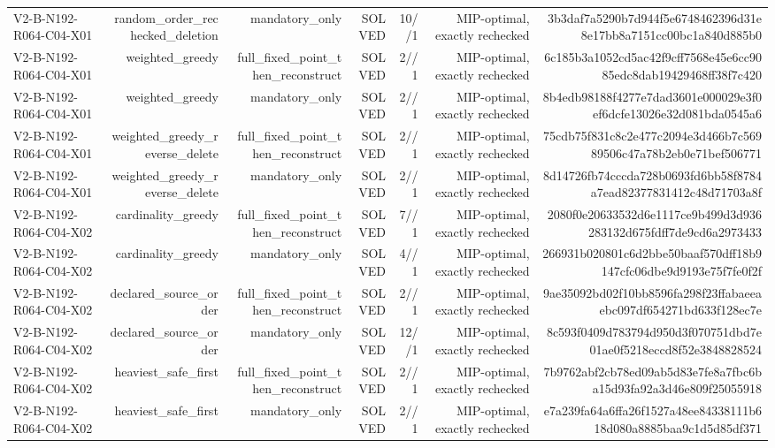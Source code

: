 {\begin{longtable}{lrrrrrr}
V2-B-N192-R064-C04-X01 & random\_order\_rechecked\_deletion & mandatory\_only & SOLVED & 10//1 & MIP-optimal, exactly rechecked & 3b3daf7a5290b7d944f5e6748462396d31e8e17bb8a7151cc00bc1a840d885b0 \\
V2-B-N192-R064-C04-X01 & weighted\_greedy & full\_fixed\_point\_then\_reconstruct & SOLVED & 2//1 & MIP-optimal, exactly rechecked & 6c185b3a1052cd5ac42f9cff7568e45e6cc9085edc8dab19429468ff38f7c420 \\
V2-B-N192-R064-C04-X01 & weighted\_greedy & mandatory\_only & SOLVED & 2//1 & MIP-optimal, exactly rechecked & 8b4edb98188f4277e7dad3601e000029e3f0ef6dcfe13026e32d081bda0545a6 \\
V2-B-N192-R064-C04-X01 & weighted\_greedy\_reverse\_delete & full\_fixed\_point\_then\_reconstruct & SOLVED & 2//1 & MIP-optimal, exactly rechecked & 75cdb75f831c8c2e477c2094e3d466b7c56989506c47a78b2eb0e71bef506771 \\
V2-B-N192-R064-C04-X01 & weighted\_greedy\_reverse\_delete & mandatory\_only & SOLVED & 2//1 & MIP-optimal, exactly rechecked & 8d14726fb74cccda728b0693fd6bb58f8784a7ead82377831412c48d71703a8f \\
V2-B-N192-R064-C04-X02 & cardinality\_greedy & full\_fixed\_point\_then\_reconstruct & SOLVED & 7//1 & MIP-optimal, exactly rechecked & 2080f0e20633532d6e1117ce9b499d3d936283132d675fdff7de9cd6a2973433 \\
V2-B-N192-R064-C04-X02 & cardinality\_greedy & mandatory\_only & SOLVED & 4//1 & MIP-optimal, exactly rechecked & 266931b020801c6d2bbe50baaf570dff18b9147cfc06dbe9d9193e75f7fe0f2f \\
V2-B-N192-R064-C04-X02 & declared\_source\_order & full\_fixed\_point\_then\_reconstruct & SOLVED & 2//1 & MIP-optimal, exactly rechecked & 9ae35092bd02f10bb8596fa298f23ffabaeeaebc097df654271bd633f128ec7e \\
V2-B-N192-R064-C04-X02 & declared\_source\_order & mandatory\_only & SOLVED & 12//1 & MIP-optimal, exactly rechecked & 8c593f0409d783794d950d3f070751dbd7e01ae0f5218eccd8f52e3848828524 \\
V2-B-N192-R064-C04-X02 & heaviest\_safe\_first & full\_fixed\_point\_then\_reconstruct & SOLVED & 2//1 & MIP-optimal, exactly rechecked & 7b9762abf2cb78ed09ab5d83e7fe8a7fbc6ba15d93fa92a3d46e809f25055918 \\
V2-B-N192-R064-C04-X02 & heaviest\_safe\_first & mandatory\_only & SOLVED & 2//1 & MIP-optimal, exactly rechecked & e7a239fa64a6ffa26f1527a48ee84338111b618d080a8885baa9c1d5d85df371 \\

\end{longtable}}
